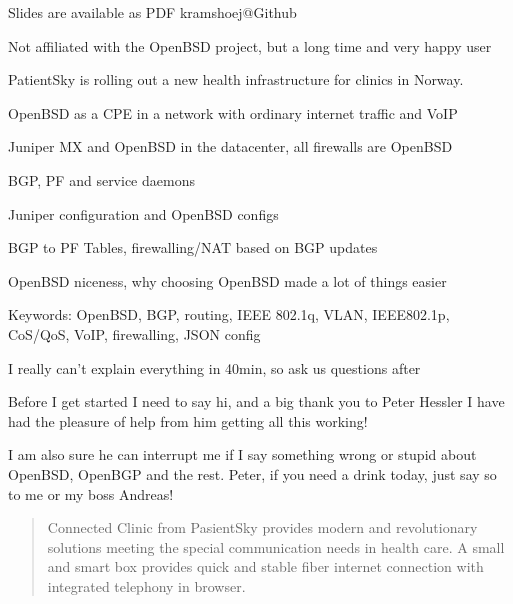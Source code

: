 \documentclass[18pt,landscape,a4paper,footrule]{foils}
\begin{document}


\vskip 1cm
\centerline{\footnotesize Slides are available as PDF kramshoej@Github}


\centerline{\footnotesize Not affiliated with the OpenBSD project, but a long time and very happy user}


PatientSky is rolling out a new health infrastructure for clinics in Norway.

\begin{list2}
\item OpenBSD as a CPE in a network with ordinary internet traffic and VoIP
\item Juniper MX and OpenBSD in the datacenter, all firewalls are OpenBSD
\item BGP, PF and service daemons
\item Juniper configuration and OpenBSD configs
\item BGP to PF Tables, firewalling/NAT based on BGP updates
\item OpenBSD niceness, why choosing OpenBSD made a lot of things easier
\item Keywords:
OpenBSD, BGP, routing, IEEE 802.1q, VLAN, IEEE802.1p, CoS/QoS, VoIP, firewalling, JSON config
\end{list2}

\centerline{I really can't explain everything in 40min, so ask us questions after}


Before I get started I need to say hi, and a big thank you to Peter Hessler
I have had the pleasure of help from him getting all this working!


I am also sure he can interrupt me if I say something wrong or stupid about OpenBSD, OpenBGP and the rest. \smiley
Peter, if you need a drink today, just say so to me or my boss Andreas!






\begin{quote}
Connected Clinic from PasientSky provides modern and revolutionary solutions meeting the special communication needs in health care. A small and smart box provides quick and stable fiber internet connection with integrated telephony in browser.
\end{quote}
\end{document}
